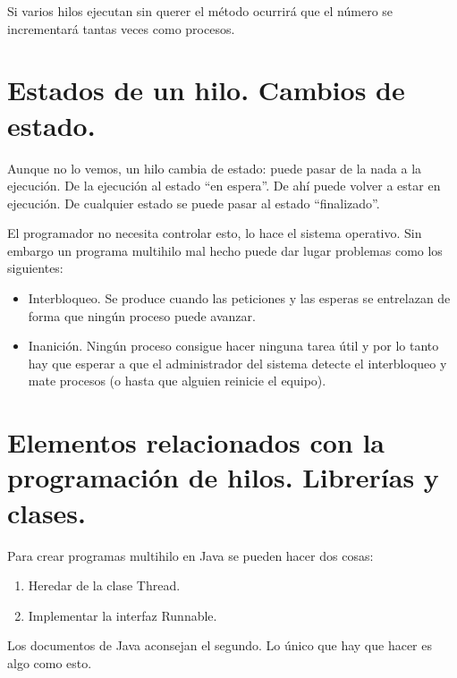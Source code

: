 \documentclass[a4paper,12pt,spanish]{sphinxmanual}
\begin{document}
Si varios hilos ejecutan sin querer el método  ocurrirá que el número se incrementará tantas veces como procesos.


\section{Estados de un hilo. Cambios de estado.}
\label{textos/tema2:estados-de-un-hilo-cambios-de-estado}
Aunque no lo vemos, un hilo cambia de estado: puede pasar de la nada a la ejecución. De la ejecución al estado ``en espera''. De ahí puede volver a estar en ejecución. De cualquier estado se puede pasar al estado ``finalizado''.

El programador no necesita controlar esto, lo hace el sistema operativo. Sin embargo un programa multihilo mal hecho puede dar lugar problemas como los siguientes:
\begin{itemize}
\item {} 
Interbloqueo. Se produce cuando las peticiones y las esperas se entrelazan de forma que ningún proceso puede avanzar.

\item {} 
Inanición. Ningún proceso consigue hacer ninguna tarea útil y por lo tanto hay que esperar a que el administrador del sistema detecte el interbloqueo y mate procesos (o hasta que alguien reinicie el equipo).

\end{itemize}


\section{Elementos relacionados con la programación de hilos. Librerías y clases.}
\label{textos/tema2:elementos-relacionados-con-la-programacion-de-hilos-librerias-y-clases}
Para crear programas multihilo en Java se pueden hacer dos cosas:
\begin{enumerate}
\item {} 
Heredar de la clase Thread.

\item {} 
Implementar la interfaz Runnable.

\end{enumerate}

Los documentos de Java aconsejan el segundo. Lo único que hay que hacer es algo como esto.
\end{document}
